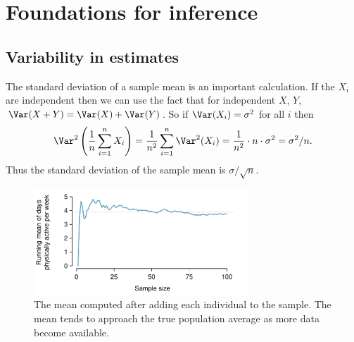 \chapter{Foundations for inference}
\label{foundationsForInference}

\section{Variability in estimates}
\label{variabilityInEstimates}

The standard deviation of a sample mean is an important calculation. If the $X_i$ are independent then we can use the fact that for independent $X$, $Y$, $\Var(X+Y)=\Var(X)+\Var(Y)$. So if $\Var(X_i)=\sigma^2$ for all $i$ then
\[
\Var^2\left(\frac1n\sum_{i=1}^nX_i\right) = \frac1{n^2}\sum_{i=1}^n\Var^2(X_i) = \frac1{n^2}\cdot n\cdot\sigma^2 = \sigma^2/n.
\]
Thus the standard deviation of the sample mean is $\sigma/\sqrt{n}$.








\begin{figure}%
   \centering
   \includegraphics[width=0.72\textwidth]{ch_inference_foundations/figures/yrbssActiveRunningMean/yrbssActiveRunningMean}
   \caption{The mean computed after adding each individual to the sample. The mean tends to approach the true population average as more data become available.}
   \label{yrbssActiveRunningMean}
\end{figure}



